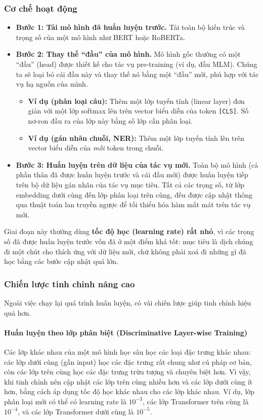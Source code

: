 \subsubsection{Cơ chế hoạt động}
\begin{itemize}
    \item \textbf{Bước 1: Tải mô hình đã huấn luyện trước.} Tải toàn bộ kiến trúc và trọng số của một mô hình như BERT hoặc RoBERTa.
    \item \textbf{Bước 2: Thay thế “đầu” của mô hình.} Mô hình gốc thường có một “đầu” (head) được thiết kế cho tác vụ pre-training (ví dụ, đầu MLM). Chúng ta sẽ loại bỏ cái đầu này và thay thế nó bằng một “đầu” mới, phù hợp với tác vụ hạ nguồn của mình.
        \begin{itemize}
            \item \textbf{Ví dụ (phân loại câu):} Thêm một lớp tuyến tính (linear layer) đơn giản với một lớp softmax lên trên vector biểu diễn của token \texttt{[CLS]}. Số nơ-ron đầu ra của lớp này bằng số lớp cần phân loại.
            \item \textbf{Ví dụ (gán nhãn chuỗi, NER):} Thêm một lớp tuyến tính lên trên vector biểu diễn của \textit{mỗi} token trong chuỗi.
        \end{itemize}
    \item \textbf{Bước 3: Huấn luyện trên dữ liệu của tác vụ mới.} Toàn bộ mô hình (cả phần thân đã được huấn luyện trước và cái đầu mới) được huấn luyện tiếp trên bộ dữ liệu gán nhãn của tác vụ mục tiêu. Tất cả các trọng số, từ lớp embedding dưới cùng đến lớp phân loại trên cùng, đều được cập nhật thông qua thuật toán lan truyền ngược để tối thiểu hóa hàm mất mát trên tác vụ mới.
\end{itemize}
Giai đoạn này thường dùng \textbf{tốc độ học (learning rate) rất nhỏ}, vì các trọng số đã được huấn luyện trước vốn đã ở một điểm khá tốt: mục tiêu là dịch chúng đi một chút cho thích ứng với dữ liệu mới, chứ không phải xoá đi những gì đã học bằng các bước cập nhật quá lớn.

\subsubsection{Chiến lược tinh chỉnh nâng cao}
Ngoài việc chạy lại quá trình huấn luyện, có vài chiến lược giúp tinh chỉnh hiệu quả hơn.
\paragraph{Huấn luyện theo lớp phân biệt (Discriminative Layer-wise Training)}
Các lớp khác nhau của một mô hình học sâu học các loại đặc trưng khác nhau: các lớp dưới cùng (gần input) học các đặc trưng rất chung như cú pháp cơ bản, còn các lớp trên cùng học các đặc trưng trừu tượng và chuyên biệt hơn. Vì vậy, khi tinh chỉnh nên cập nhật các lớp trên cùng nhiều hơn và các lớp dưới cùng ít hơn, bằng cách áp dụng tốc độ học khác nhau cho các lớp khác nhau. Ví dụ, lớp phân loại mới có thể có learning rate là $10^{-3}$, các lớp Transformer trên cùng là $10^{-4}$, và các lớp Transformer dưới cùng là $10^{-5}$.

